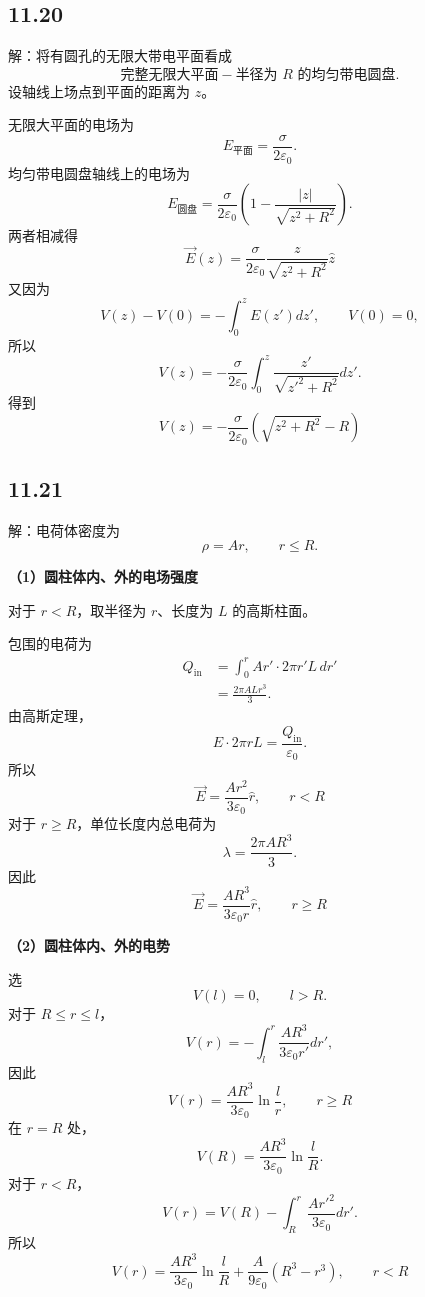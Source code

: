 \documentclass[UTF8,a4paper,12pt]{ctexart}
\begin{document}
\subsection*{11.20}

解：将有圆孔的无限大带电平面看成
\[
\text{完整无限大平面}
-
\text{半径为 }R\text{ 的均匀带电圆盘}.
\]
设轴线上场点到平面的距离为 $z$。

无限大平面的电场为
\[
E_{\text{平面}}
=
\frac{\sigma}{2\varepsilon_0}.
\]
均匀带电圆盘轴线上的电场为
\[
E_{\text{圆盘}}
=
\frac{\sigma}{2\varepsilon_0}
\left(
1-\frac{|z|}{\sqrt{z^2+R^2}}
\right).
\]
两者相减得
\[
\boxed{
\vec{E}(z)
=
\frac{\sigma}{2\varepsilon_0}
\frac{z}{\sqrt{z^2+R^2}}
\hat{z}
}
\]
又因为
\[
V(z)-V(0)
=
-\int_0^zE(z')dz',
\qquad
V(0)=0,
\]
所以
\[
V(z)
=
-\frac{\sigma}{2\varepsilon_0}
\int_0^z
\frac{z'}{\sqrt{z'^2+R^2}}dz'.
\]
得到
\[
\boxed{
V(z)
=
-\frac{\sigma}{2\varepsilon_0}
\left(
\sqrt{z^2+R^2}-R
\right)
}
\]

\subsection*{11.21}

解：电荷体密度为
\[
\rho=Ar,
\qquad r\le R.
\]

\textbf{（1）圆柱体内、外的电场强度}

对于 $r<R$，取半径为 $r$、长度为 $L$ 的高斯柱面。

包围的电荷为
\[
\begin{aligned}
Q_{\text{in}}
&=
\int_0^r Ar'\cdot2\pi r'L\,dr'\\
&=
\frac{2\pi ALr^3}{3}.
\end{aligned}
\]
由高斯定理，
\[
E\cdot2\pi rL
=
\frac{Q_{\text{in}}}{\varepsilon_0}.
\]
所以
\[
\boxed{
\vec{E}
=
\frac{Ar^2}{3\varepsilon_0}\hat{r},
\qquad r<R
}
\]
对于 $r\ge R$，单位长度内总电荷为
\[
\lambda
=
\frac{2\pi AR^3}{3}.
\]
因此
\[
\boxed{
\vec{E}
=
\frac{AR^3}{3\varepsilon_0r}\hat{r},
\qquad r\ge R
}
\]

\textbf{（2）圆柱体内、外的电势}

选
\[
V(l)=0,
\qquad l>R.
\]
对于 $R\le r\le l$，
\[
V(r)
=
-\int_l^r
\frac{AR^3}{3\varepsilon_0r'}dr',
\]
因此
\[
\boxed{
V(r)
=
\frac{AR^3}{3\varepsilon_0}
\ln\frac{l}{r},
\qquad r\ge R
}
\]
在 $r=R$ 处，
\[
V(R)
=
\frac{AR^3}{3\varepsilon_0}
\ln\frac{l}{R}.
\]
对于 $r<R$，
\[
V(r)
=
V(R)
-
\int_R^r
\frac{Ar'^2}{3\varepsilon_0}dr'.
\]
所以
\[
\boxed{
V(r)
=
\frac{AR^3}{3\varepsilon_0}
\ln\frac{l}{R}
+
\frac{A}{9\varepsilon_0}
\left(R^3-r^3\right),
\qquad r<R
}
\]
\end{document}
